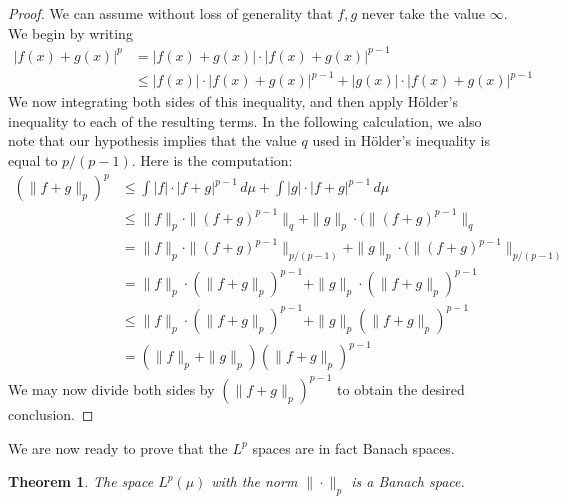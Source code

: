 \documentclass[11pt,oneside]{amsbook}
\theoremstyle{definition}
\theoremstyle{plain}
\newtheorem{thm}{Theorem}[section]
\theoremstyle{definition}
\theoremstyle{remark}
\numberwithin{equation}{section}
\numberwithin{figure}{section}
\begin{document}
\begin{proof}
  We can assume without loss of generality that $f,g$ never take the value $\infty$. We begin by writing
  \begin{align*}
    |f(x)+g(x)|^p&=|f(x)+g(x)|\cdot|f(x)+g(x)|^{p-1}\\
                 &\leq|f(x)|\cdot|f(x)+g(x)|^{p-1}
                   +|g(x)|\cdot|f(x)+g(x)|^{p-1}
  \end{align*}
  We now integrating both sides of this inequality, and then apply H\"older's inequality to each of the resulting terms. In the following calculation, we also note that our hypothesis implies that the value $q$ used in H\"older's inequality is equal to $p/(p-1)$. Here is the computation:
  \begin{align*}
    (\|f+g\|_p)^p&\leq\int|f|\cdot|f+g|^{p-1}\,d\mu
                   +\int|g|\cdot|f+g|^{p-1}\,d\mu\\
                 &\leq\|f\|_p\cdot\|(f+g)^{p-1}\|_q
                   +\|g\|_p\cdot(\|(f+g)^{p-1}\|_q\\
                 &=\|f\|_p\cdot\|(f+g)^{p-1}\|_{p/(p-1)}
                   +\|g\|_p\cdot(\|(f+g)^{p-1}\|_{p/(p-1)}\\
                 &=\|f\|_p\cdot(\|f+g\|_p)^{p-1}
                   +\|g\|_p\cdot(\|f+g\|_p)^{p-1}\\
                 &\leq\|f\|_p\cdot(\|f+g\|_p)^{p-1}
                   +\|g\|_p(\|f+g\|_p)^{p-1}\\
                 &=(\|f\|_p+\|g\|_p)(\|f+g\|_p)^{p-1}
  \end{align*}
  We may now divide both sides by $(\|f+g\|_p)^{p-1}$ to obtain the desired conclusion.
\end{proof}

We are now ready to prove that the $L^p$ spaces are in fact Banach spaces.

\begin{thm}
  The space $L^p(\mu)$ with the norm $\|\cdot\|_p$ is a Banach space.
\end{thm}
\end{document}
